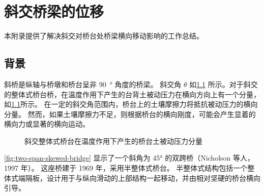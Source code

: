 \chapter{斜交桥梁的位移}
本附录提供了解决斜交对桥台处桥梁横向移动影响的工作总结。

\section{背景}
斜桥是纵轴与桥墩和桥台呈非 \qty{90}{\degree} 角度的桥梁。 斜交角 $\theta$ 如\cref{fig:skewed-bridge-thermal-elongation} 所示。对于斜交的整体式桥台桥，在温度作用下产生的台背土被动压力在横向方向上有一个分量，如\cref{fig:skewed-bridge-thermal-elongation}所示。 在一定的斜交角范围内，桥台上的土壤摩擦力将抵抗被动压力的横向分量。 然而，如果土壤摩擦力不足，则根据桥台的横向刚度，可能会产生显着的横向力或显著的横向运动。

\begin{figure}
  \caption{斜交整体式桥台在温度作用下产生的桥台土被动压力分量}
  \label{fig:skewed-bridge-thermal-elongation}
\end{figure}

\cref{fig:two-span-skewed-bridge} 显示了一个斜角为 \ang{45} 的双跨桥（Nicholson 等人，1997 年）。 这座桥建于 1969 年，采用半整体式桥台。 半整体式结构包括一个整体式端隔板，设计用于与纵向滑动的上部结构一起移动，并由相对坚硬的桥台横向引导。

